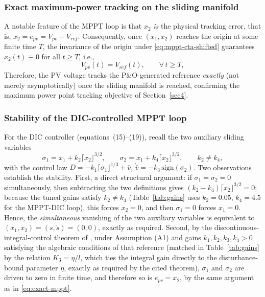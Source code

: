 \documentclass[preprint,12pt]{elsarticle}
\begin{document}
\subsubsection{Exact maximum-power tracking on the sliding manifold}
\label{subsubsec:exact-mppt-tracking}

A notable feature of the MPPT loop is that $x_2$ \emph{is} the physical tracking error, that is, $x_2 = e_{pv} = V_{pv}-V_{ref}$. Consequently, once $(x_1,x_2)$ reaches the origin at some finite time $T$, the invariance of the origin under \eqref{eq:mppt-cta-shifted} guarantees $x_2(t) \equiv 0$ for all $t \geq T$, i.e.,
\begin{equation}
    V_{pv}(t) = V_{ref}(t), \qquad \forall\, t \geq T,
    \label{eq:exact-mppt}
\end{equation}
Therefore, the PV voltage tracks the P\&O-generated reference \emph{exactly} (not merely asymptotically) once the sliding manifold is reached, confirming the maximum power point tracking objective of Section~\ref{sec4}.

\subsubsection{Stability of the DIC-controlled MPPT loop}
\label{subsubsec:dic-mppt-stability}

For the DIC controller (equations~(15)--(19)), recall the two auxiliary sliding variables
\begin{equation}
    \sigma_1 = x_1 + k_2\lceil x_2\rfloor^{3/2}, \qquad \sigma_2 = x_1 + k_4\lceil x_2\rfloor^{3/2}, \qquad k_2 \neq k_4,
    \label{eq:sigma-dic}
\end{equation}
with the control law $D = -k_1\lceil\sigma_1\rfloor^{1/3}+\bar v$, $\dot{\bar v}=-k_3\,\mathrm{sign}(\sigma_2)$. Two observations establish the stability. First, a direct structural argument: if $\sigma_1=\sigma_2=0$ simultaneously, then subtracting the two definitions gives $(k_2-k_4)\lceil x_2\rfloor^{3/2}=0$; because the tuned gains satisfy $k_2\neq k_4$ (Table~\ref{tab:gains} uses $k_2=0.05$, $k_4=4.5$ for the MPPT-DIC loop), this forces $x_2=0$, and then $\sigma_1=0$ forces $x_1=0$. Hence, the \emph{simultaneous} vanishing of the two auxiliary variables is equivalent to $(x_1,x_2)=(s,\dot s)=(0,0)$, exactly as required. Second, by the discontinuous-integral-control theorem of \cite{moreno2017discontinuous}, under Assumption (A1) and gains $k_1,k_2,k_3,k_4>0$ satisfying the algebraic conditions of that reference (matched in Table~\ref{tab:gains} by the relation $K_3 = \eta/l$, which ties the integral gain directly to the disturbance-bound parameter $\eta$, exactly as required by the cited theorem), $\sigma_1$ and $\sigma_2$ are driven to zero in finite time, and therefore so is $e_{pv}=x_2$, by the same argument as in \eqref{eq:exact-mppt}.
\end{document}
